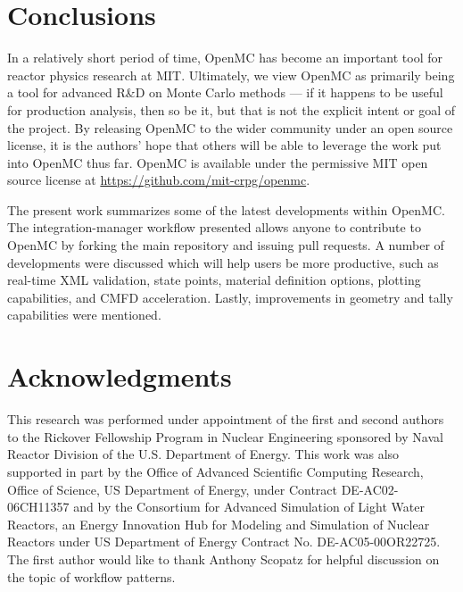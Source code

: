 \documentclass{ansconf}
\begin{document}
\section{Conclusions}

In a relatively short period of time, OpenMC has become an important tool for
reactor physics research at MIT. Ultimately, we view OpenMC as primarily being a
tool for advanced R\&D on Monte Carlo methods --- if it happens to be useful for
production analysis, then so be it, but that is not the explicit intent or goal
of the project. By releasing OpenMC to the wider community under an open source
license, it is the authors' hope that others will be able to leverage the work
put into OpenMC thus far. OpenMC is available under the permissive MIT open
source license at \url{https://github.com/mit-crpg/openmc}.

The present work summarizes some of the latest developments within OpenMC. The
integration-manager workflow presented allows anyone to contribute to OpenMC by
forking the main repository and issuing pull requests. A number of developments
were discussed which will help users be more productive, such as real-time XML
validation, state points, material definition options, plotting capabilities,
and CMFD acceleration. Lastly, improvements in geometry and tally capabilities
were mentioned.

\section*{Acknowledgments}

This research was performed under appointment of the first and second authors to
the Rickover Fellowship Program in Nuclear Engineering sponsored by Naval
Reactor Division of the U.S. Department of Energy. This work was also supported
in part by the Office of Advanced Scientific Computing Research, Office of
Science, US Department of Energy, under Contract DE-AC02-06CH11357 and by the
Consortium for Advanced Simulation of Light Water Reactors, an Energy Innovation
Hub for Modeling and Simulation of Nuclear Reactors under US Department of
Energy Contract No. DE-AC05-00OR22725. The first author would like to thank
Anthony Scopatz for helpful discussion on the topic of workflow patterns.

\setlength{\baselineskip}{12pt}



\end{document}
